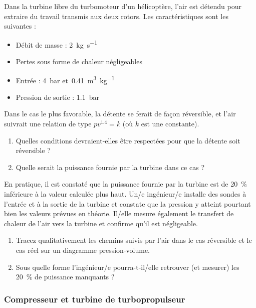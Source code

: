	Dans la turbine libre du turbomoteur d’un hélicoptère, l’air est détendu pour extraire du travail transmis aux deux rotors. Les caractéristiques sont les suivantes :
	
	\begin{itemize}
		\item Débit de masse : 		\tab \SI{2}{\kilogram\per\second}
		\item Pertes sous forme de chaleur négligeables
		\item Entrée :  				\tab \SI{4}{\bar} et~\SI{0,41}{\metre\cubed\per\kilogram}
		\item Pression de sortie : \tab \SI{1,1}{\bar}
	\end{itemize}
	
	Dans le cas le plus favorable, la détente se ferait de façon réversible, et l’air suivrait une relation de type $p v^{\num{1,4}} = k$ (où $k$ est une constante).
	
	\begin{enumerate}
		\item Quelles conditions devraient-elles être respectées pour que la détente soit réversible ?
		\item Quelle serait la puissance fournie par la turbine dans ce cas ?
	\end{enumerate}
	
	En pratique, il est constaté que la puissance fournie par la turbine est de \SI{20}{\percent} inférieure à la valeur calculée plus haut. Un/e ingénieur/e installe des sondes à l’entrée et à la sortie de la turbine et constate que la pression y atteint pourtant bien les valeurs prévues en théorie. Il/elle mesure également le transfert de chaleur de l’air vers la turbine et confirme qu’il est négligeable.
	
	\begin{enumerate}
		\item Tracez qualitativement les chemins suivis par l’air dans le cas réversible et le cas réel sur un diagramme pression-volume.
		\item Sous quelle forme l’ingénieur/e pourra-t-il/elle retrouver (et mesurer) les \SI{20}{\percent} de puissance manquants ?
	\end{enumerate}


	
\subsubsection{Compresseur et turbine de turbopropulseur}
\label{exo_compresseur_turbine_turbopropulseur}

